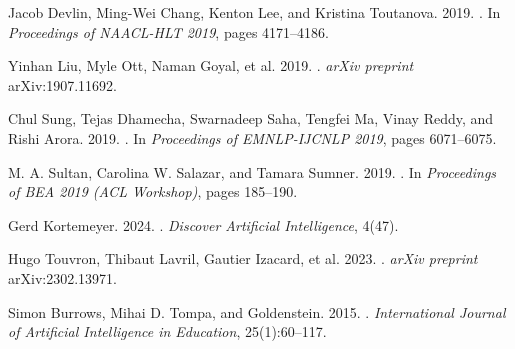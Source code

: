 \documentclass[11pt]{article}
\begin{document}
\newpage


\begin{thebibliography}{}

Jacob Devlin, Ming-Wei Chang, Kenton Lee, and Kristina Toutanova. 2019. 
. 
\newblock In \textit{Proceedings of NAACL-HLT 2019}, pages 4171--4186.

Yinhan Liu, Myle Ott, Naman Goyal, et al. 2019. 
. 
\newblock \textit{arXiv preprint} arXiv:1907.11692.

Chul Sung, Tejas Dhamecha, Swarnadeep Saha, Tengfei Ma, Vinay Reddy, and Rishi Arora. 2019.
. 
\newblock In \textit{Proceedings of EMNLP-IJCNLP 2019}, pages 6071--6075.

M. A. Sultan, Carolina W. Salazar, and Tamara Sumner. 2019.
. 
\newblock In \textit{Proceedings of BEA 2019 (ACL Workshop)}, pages 185--190.

Gerd Kortemeyer. 2024.
. 
\newblock \textit{Discover Artificial Intelligence}, 4(47).

Hugo Touvron, Thibaut Lavril, Gautier Izacard, et al. 2023.
. 
\newblock \textit{arXiv preprint} arXiv:2302.13971.

Simon Burrows, Mihai D. Tompa, and Goldenstein. 2015.
. 
\newblock \textit{International Journal of Artificial Intelligence in Education}, 25(1):60--117.

\end{thebibliography}
\end{document}
